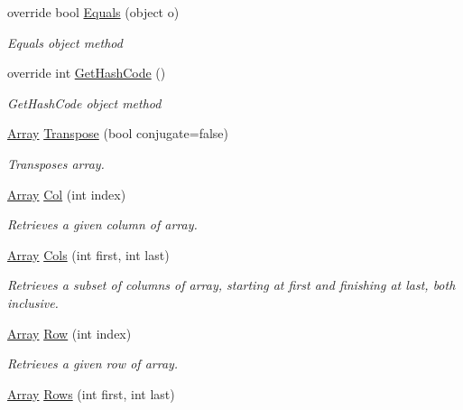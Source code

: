 \begin{DoxyCompactItemize}
override bool \mbox{\hyperlink{classkhiva_1_1array_1_1_array_a3ace1346ee73dfa29c0aeb396526250e}{Equals}} (object o)
\begin{DoxyCompactList}\small\item\em Equals object method \end{DoxyCompactList}\item 
override int \mbox{\hyperlink{classkhiva_1_1array_1_1_array_a35f31b244d648799ebd9d7294950551a}{Get\+Hash\+Code}} ()
\begin{DoxyCompactList}\small\item\em Get\+Hash\+Code object method \end{DoxyCompactList}\item 
\mbox{\hyperlink{classkhiva_1_1array_1_1_array}{Array}} \mbox{\hyperlink{classkhiva_1_1array_1_1_array_a51c8e2b81d2305bad110957c7c495e9e}{Transpose}} (bool conjugate=false)
\begin{DoxyCompactList}\small\item\em Transposes array. \end{DoxyCompactList}\item 
\mbox{\hyperlink{classkhiva_1_1array_1_1_array}{Array}} \mbox{\hyperlink{classkhiva_1_1array_1_1_array_ad5a1611739c07fa7dac698a8fa6dd388}{Col}} (int index)
\begin{DoxyCompactList}\small\item\em Retrieves a given column of array. \end{DoxyCompactList}\item 
\mbox{\hyperlink{classkhiva_1_1array_1_1_array}{Array}} \mbox{\hyperlink{classkhiva_1_1array_1_1_array_a873de346b0e3e7972d25f9206dc98679}{Cols}} (int first, int last)
\begin{DoxyCompactList}\small\item\em Retrieves a subset of columns of array, starting at first and finishing at last, both inclusive. \end{DoxyCompactList}\item 
\mbox{\hyperlink{classkhiva_1_1array_1_1_array}{Array}} \mbox{\hyperlink{classkhiva_1_1array_1_1_array_a5d233225d9134829d619bdabbdffd086}{Row}} (int index)
\begin{DoxyCompactList}\small\item\em Retrieves a given row of array. \end{DoxyCompactList}\item 
\mbox{\hyperlink{classkhiva_1_1array_1_1_array}{Array}} \mbox{\hyperlink{classkhiva_1_1array_1_1_array_a510cc22793c427195b392c0c1b787a53}{Rows}} (int first, int last)

\end{DoxyCompactItemize}
